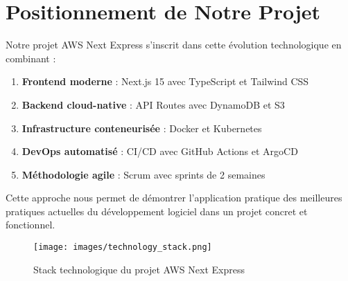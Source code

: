 \section{Positionnement de Notre Projet}

Notre projet AWS Next Express s'inscrit dans cette évolution technologique en combinant :

\begin{enumerate}
    \item \textbf{Frontend moderne} : Next.js 15 avec TypeScript et Tailwind CSS
    \item \textbf{Backend cloud-native} : API Routes avec DynamoDB et S3
    \item \textbf{Infrastructure conteneurisée} : Docker et Kubernetes
    \item \textbf{DevOps automatisé} : CI/CD avec GitHub Actions et ArgoCD
    \item \textbf{Méthodologie agile} : Scrum avec sprints de 2 semaines
\end{enumerate}

Cette approche nous permet de démontrer l'application pratique des meilleures pratiques actuelles du développement logiciel dans un projet concret et fonctionnel.

\begin{figure}[H]
    \centering
    \texttt{[image: images/technology\_stack.png]}
    \caption{Stack technologique du projet AWS Next Express}
    \label{fig:technology_stack}
\end{figure} 
